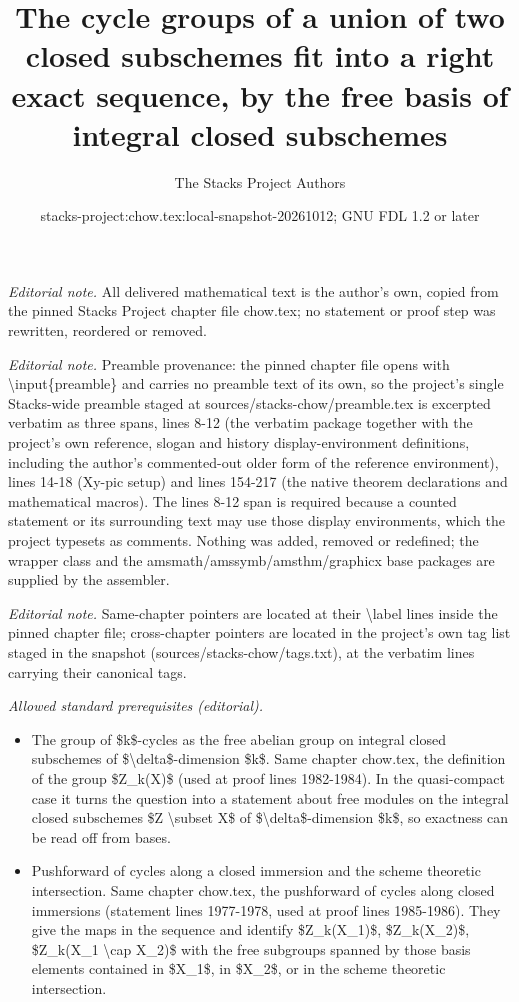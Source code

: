 \documentclass[10pt,a4paper]{amsart}
\title{The cycle groups of a union of two closed subschemes fit into a right exact sequence, by the free basis of integral closed subschemes}
\author{The Stacks Project Authors}
\date{stacks-project:chow.tex:local-snapshot-20261012; GNU FDL 1.2 or later}
\theoremstyle{plain}
\theoremstyle{definition}
\theoremstyle{remark}
\numberwithin{equation}{subsection}
\begin{document}
\maketitle
\noindent\textit{Editorial note.} All delivered mathematical text is the author's own, copied from the pinned Stacks Project chapter file chow.tex; no statement or proof step was rewritten, reordered or removed.\par\medskip
\noindent\textit{Editorial note.} Preamble provenance: the pinned chapter file opens with \textbackslash{}input\{preamble\} and carries no preamble text of its own, so the project's single Stacks-wide preamble staged at sources/stacks-chow/preamble.tex is excerpted verbatim as three spans, lines 8-12 (the verbatim package together with the project's own reference, slogan and history display-environment definitions, including the author's commented-out older form of the reference environment), lines 14-18 (Xy-pic setup) and lines 154-217 (the native theorem declarations and mathematical macros). The lines 8-12 span is required because a counted statement or its surrounding text may use those display environments, which the project typesets as comments. Nothing was added, removed or redefined; the wrapper class and the amsmath/amssymb/amsthm/graphicx base packages are supplied by the assembler.\par\medskip
\noindent\textit{Editorial note.} Same-chapter pointers are located at their \textbackslash{}label lines inside the pinned chapter file; cross-chapter pointers are located in the project's own tag list staged in the snapshot (sources/stacks-chow/tags.txt), at the verbatim lines carrying their canonical tags.\par\medskip
\noindent\textit{Allowed standard prerequisites (editorial).}\begin{itemize}
\item The group of \$k\$-cycles as the free abelian group on integral closed subschemes of \$\textbackslash{}delta\$-dimension \$k\$. Same chapter chow.tex, the definition of the group \$Z\_k(X)\$ (used at proof lines 1982-1984). In the quasi-compact case it turns the question into a statement about free modules on the integral closed subschemes \$Z \textbackslash{}subset X\$ of \$\textbackslash{}delta\$-dimension \$k\$, so exactness can be read off from bases.
\item Pushforward of cycles along a closed immersion and the scheme theoretic intersection. Same chapter chow.tex, the pushforward of cycles along closed immersions (statement lines 1977-1978, used at proof lines 1985-1986). They give the maps in the sequence and identify \$Z\_k(X\_1)\$, \$Z\_k(X\_2)\$, \$Z\_k(X\_1 \textbackslash{}cap X\_2)\$ with the free subgroups spanned by those basis elements contained in \$X\_1\$, in \$X\_2\$, or in the scheme theoretic intersection.
\end{itemize}\medskip
\end{document}
